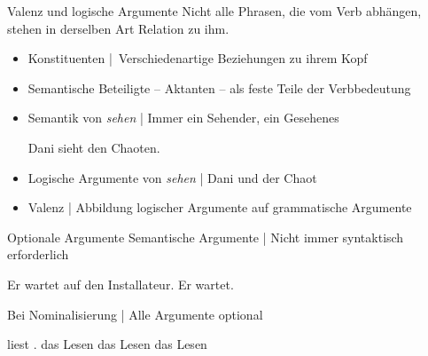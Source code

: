 \begin{frame}
  {Valenz und logische Argumente}
  \onslide<+->
  \onslide<+->
  Nicht alle Phrasen, die vom Verb abhängen, stehen in derselben Art Relation zu ihm.\\
  \Zeile
  \begin{itemize}[<+->]
    \item Konstituenten | Verschiedenartige Beziehungen zu ihrem Kopf
    \item Semantische Beteiligte -- \alert{Aktanten} -- als \alert{feste Teile der Verbbedeutung}
    \item Semantik von \textit{sehen} | Immer ein \alert{Sehender}, ein \alert{Gesehenes}
      \Viertelzeile
      \begin{exe}
       \ex Dani sieht den Chaoten.
      \end{exe}
    \item \alert{Logische Argumente von \textit{sehen}} | Dani und der Chaot
    \item Valenz | Abbildung logischer Argumente auf grammatische Argumente
  \end{itemize}
\end{frame}

\begin{frame}
  {Optionale Argumente}
  \onslide<+->
  \onslide<+->
  Semantische Argumente | Nicht immer syntaktisch erforderlich\\
  \onslide<+->
  \Halbzeile
    \begin{exe}
      \ex Er wartet \alert{auf den Installateur}.
      \ex Er wartet.
    \end{exe}
  \onslide<+->
  \Zeile
  Bei \alert{Nominalisierung} | Alle Argumente optional\\
  \onslide<+->
  \Halbzeile
    \begin{exe}
      \ex {} \alert{liest} .
      \ex \alert{das Lesen}  
      \ex \alert{das Lesen}  
      \ex \alert{das Lesen} 
    \end{exe}
\end{frame}


